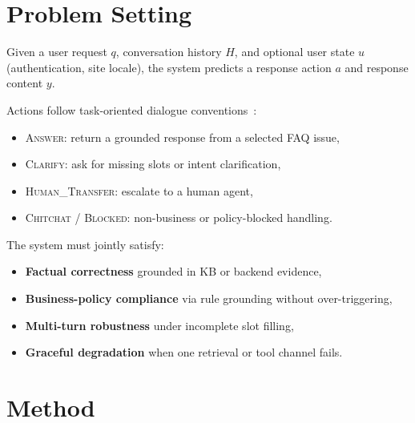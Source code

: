 \documentclass[sigconf,review]{acmart}
\begin{document}
\section{Problem Setting}
Given a user request $q$, conversation history $H$, and optional user state $u$ (authentication, site locale), the system predicts a response action $a$ and response content $y$.

Actions follow task-oriented dialogue conventions~\cite{young2013pomdp,wen2017network}:
\begin{itemize}[leftmargin=1.2em]
  \item \textsc{Answer}: return a grounded response from a selected FAQ issue,
  \item \textsc{Clarify}: ask for missing slots or intent clarification,
  \item \textsc{Human\_Transfer}: escalate to a human agent,
  \item \textsc{Chitchat} / \textsc{Blocked}: non-business or policy-blocked handling.
\end{itemize}

The system must jointly satisfy:
\begin{itemize}[leftmargin=1.2em]
  \item \textbf{Factual correctness} grounded in KB or backend evidence,
  \item \textbf{Business-policy compliance} via rule grounding without over-triggering,
  \item \textbf{Multi-turn robustness} under incomplete slot filling,
  \item \textbf{Graceful degradation} when one retrieval or tool channel fails.
\end{itemize}

\section{Method}
\end{document}
